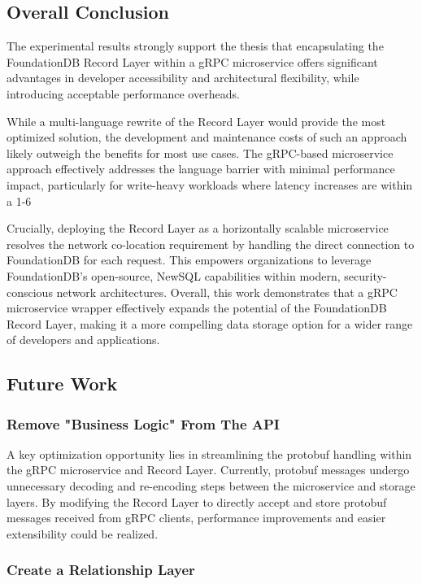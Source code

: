 \documentclass[sigconf]{acmart}
\begin{document}
\subsection{Overall Conclusion}

The experimental results strongly support the thesis that encapsulating the FoundationDB Record Layer within a gRPC microservice offers significant advantages in developer accessibility and architectural flexibility, while introducing acceptable performance overheads.

While a multi-language rewrite of the Record Layer would provide the most optimized solution, the development and maintenance costs of such an approach likely outweigh the benefits for most use cases.
The gRPC-based microservice approach effectively addresses the language barrier with minimal performance impact, particularly for write-heavy workloads where latency increases are within a 1-6%

Crucially, deploying the Record Layer as a horizontally scalable microservice resolves the network co-location requirement by handling the direct connection to FoundationDB for each request.
This empowers organizations to leverage FoundationDB's open-source, NewSQL capabilities within modern, security-conscious network architectures.
Overall, this work demonstrates that a gRPC microservice wrapper effectively expands the potential of the FoundationDB Record Layer, making it a more compelling data storage option for a wider range of developers and applications.

\subsection{Future Work}

\subsubsection{Remove "Business Logic" From The API}

A key optimization opportunity lies in streamlining the protobuf handling within the gRPC microservice and Record Layer. Currently, protobuf messages undergo unnecessary decoding and re-encoding steps between the microservice and storage layers.
By modifying the Record Layer to directly accept and store protobuf messages received from gRPC clients, performance improvements and easier extensibility could be realized.

\subsubsection{Create a Relationship Layer}
\end{document}
